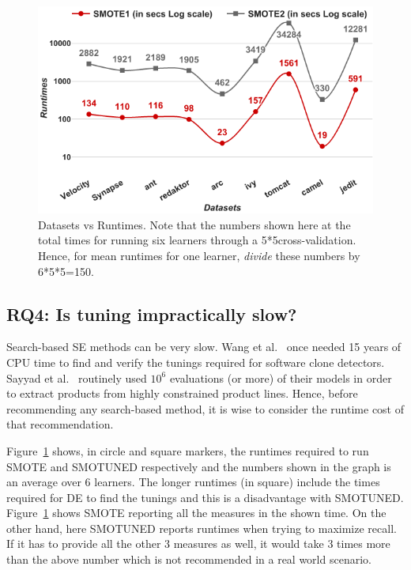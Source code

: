 \documentclass[10pt,conference]{IEEEtran}
\theoremstyle{break}
\theoremstyle{break}
\begin{document}
\begin{figure}[!htbp]
  \captionsetup{justification=centering}
  \includegraphics[width=\linewidth]{./fig/runtimes.png}
  \caption{Datasets vs Runtimes. Note that the numbers
  shown here at the total times for running six learners through a 5*5cross-validation. Hence, for mean
  runtimes for one learner, {\em divide} these numbers by 6*5*5=150.}
  \label{runtime}
\vspace{-0.7cm}
\end{figure}


\subsection{\textbf{RQ4: Is tuning impractically slow?}}

Search-based SE methods can be very slow. Wang et al.~\cite{wang2013searching} once needed 15
years of CPU time to find and verify the tunings required for software
clone detectors. Sayyad et al.~\cite{sayyad2013scalable} routinely used
$10^6$ evaluations (or more) of their models in order to extract
products from highly constrained product
lines. Hence, before recommending any
search-based method, it is wise to consider the runtime cost of that
recommendation.


 Figure~\ref{runtime} shows,  in circle and square markers, the
  runtimes required to run SMOTE and SMOTUNED respectively and the numbers shown in the graph is an average over 6 learners.  The
  longer runtimes (in square) include the times required for DE to find
  the tunings and this is a disadvantage with SMOTUNED. Figure~\ref{runtime} shows SMOTE reporting all the measures in the shown time. On the other hand, here SMOTUNED reports runtimes when trying to maximize recall. If it has to provide all the other 3 measures as well, it would take 3 times more than the above number which is not recommended in a real world scenario. 
  
\end{document}
